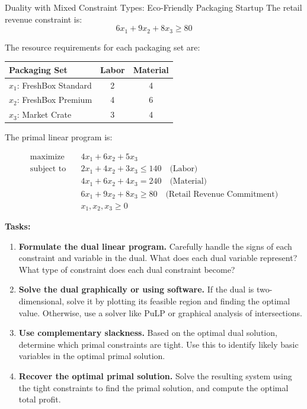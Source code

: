 \begin{ex}{Duality with Mixed Constraint Types: Eco-Friendly Packaging Startup}{}
The retail revenue constraint is:
\[
6x_1 + 9x_2 + 8x_3 \geq 80
\]

The resource requirements for each packaging set are:

\begin{center}
\begin{tabular}{|l|c|c|}
\hline
Packaging Set & Labor & Material \\
\hline
$x_1$: FreshBox Standard & 2 & 4 \\
$x_2$: FreshBox Premium & 4 & 6 \\
$x_3$: Market Crate & 3 & 4 \\
\hline
\end{tabular}
\par{}\label{tab:complimentary-slackness-tab05}%

\end{center}

The primal linear program is:

\[
\begin{aligned}
\text{maximize} \quad & 4x_1 + 6x_2 + 5x_3 \\
\text{subject to} \quad 
& 2x_1 + 4x_2 + 3x_3 \leq 140 \quad \text{(Labor)} \\
& 4x_1 + 6x_2 + 4x_3 = 240 \quad \text{(Material)} \\
& 6x_1 + 9x_2 + 8x_3 \geq 80 \quad \text{(Retail Revenue Commitment)} \\
& x_1, x_2, x_3 \geq 0
\end{aligned}
\]

\textbf{Tasks:}

\begin{enumerate}
  \item \textbf{Formulate the dual linear program.}  
  Carefully handle the signs of each constraint and variable in the dual. What does each dual variable represent? What type of constraint does each dual constraint become?

  \item \textbf{Solve the dual graphically or using software.}  
  If the dual is two-dimensional, solve it by plotting its feasible region and finding the optimal value. Otherwise, use a solver like PuLP or graphical analysis of intersections.

  \item \textbf{Use complementary slackness.}  
  Based on the optimal dual solution, determine which primal constraints are tight. Use this to identify likely basic variables in the optimal primal solution.

  \item \textbf{Recover the optimal primal solution.}
  Solve the resulting system using the tight constraints to find the primal solution, and compute the optimal total profit.
\end{enumerate}
\exrefs{\S\ref{sec:duality-forms}, \S\ref{sec:cs-solving}}
\end{ex}


